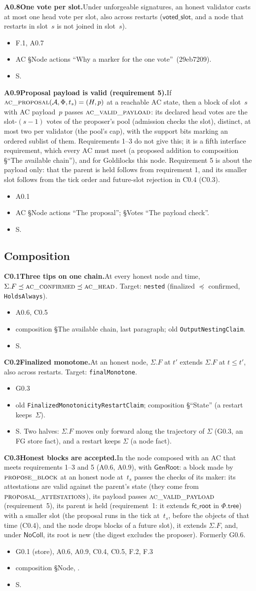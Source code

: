 \documentclass{article}
\newcommand{\AC}{\mathcal A}
\newcommand{\Fr}{\Phi}
\newcommand{\fcroot}{\mathsf{fc\_root}}
\newcommand{\fname}[1]{\text{\textsc{#1}}}
\newcommand{\dagnode}[6]{%
\par\medskip\noindent\textbf{#1\enspace #2.}\enspace #3
\begin{itemize}[leftmargin=2.2em,itemsep=0pt,topsep=2pt]
\item[\emph{Uses}] #4
\item[\emph{Evid.}] #5
\item[\emph{Task}] #6
\end{itemize}}
\begin{document}
\dagnode{A0.8}{One vote per slot}{Under unforgeable signatures, an honest
validator casts at most one head vote per slot, also across restarts
($\mathsf{voted\_slot}$, and a node that restarts in slot~$s$ is not joined in
slot~$s$).}
{F.1, A0.7}{AC \S Node actions ``Why a marker for the one vote''~(29eb7209).}{S.}

\dagnode{A0.9}{Proposal payload is valid (requirement 5)}{If
$\fname{ac\_proposal}(\AC,\Fr,t_s)=(H,p)$ at a reachable AC state, then a block of
slot~$s$ with AC payload~$p$ passes $\fname{ac\_valid\_payload}$: its declared
head votes are the slot-$(s-1)$ votes of the proposer's pool (admission checks
the slot), distinct, at most two per validator (the pool's cap), with the
support bits marking an ordered sublist of them.  Requirements 1--3 do not give
this; it is a fifth interface requirement, which every AC must meet (a proposed
addition to composition \S``The available chain''), and for
Goldilocks this node.  Requirement 5 is about the payload only: that the parent
is held follows from requirement 1, and its smaller slot follows from the tick
order and future-slot rejection in C0.4 (C0.3).}
{A0.1}{AC \S Node actions ``The proposal''; \S Votes ``The payload check''.}{S.}

\subsection{Composition}

\dagnode{C0.1}{Three tips on one chain}{At every honest node and time,
$\Sigma.F\preceq\fname{ac\_confirmed}\preceq\fname{ac\_head}$.  Target:
\texttt{nested} (finalized $\preceq$ confirmed, \texttt{HoldsAlways}).}
{A0.6, C0.5}{composition \S The available chain, last paragraph; old
\texttt{OutputNestingClaim}.}{S.}

\dagnode{C0.2}{Finalized monotone}{At an honest node, $\Sigma.F$ at $t'$
extends $\Sigma.F$ at $t\leq t'$, also across restarts.  Target:
\texttt{finalMonotone}.}
{G0.3}{old \texttt{FinalizedMonotonicityRestartClaim}; composition \S``State'' (a
restart keeps~$\Sigma$).}{S.  Two halves: $\Sigma.F$
moves only forward along the trajectory of $\Sigma$ (G0.3, an FG store fact),
and a restart keeps $\Sigma$ (a node fact).}

\dagnode{C0.3}{Honest blocks are accepted}{In the node composed with an AC
that meets requirements 1--3 and 5 (A0.6, A0.9), with $\mathsf{GenRoot}$: a block made by
$\fname{propose\_block}$ at an honest node at~$t_s$ passes the checks of its
maker: its attestations are valid against the parent's state (they come from
$\fname{proposal\_attestations}$), its payload passes $\fname{ac\_valid\_payload}$
(requirement~5), its parent is held (requirement~1: it extends $\fcroot$
in $\Fr.\mathsf{tree}$) with a smaller slot (the proposal runs in the tick at~$t_s$,
before the objects of that time (C0.4), and the node drops blocks of a future
slot), it extends $\Sigma.F$, and, under $\mathsf{NoColl}$, its root is new (the
digest excludes the proposer).  Formerly G0.6.}
{G0.1 (store), A0.6, A0.9, C0.4, C0.5, F.2, F.3}{composition \S Node,
\fname{proposal\_attestations}.}{S.}
\end{document}
